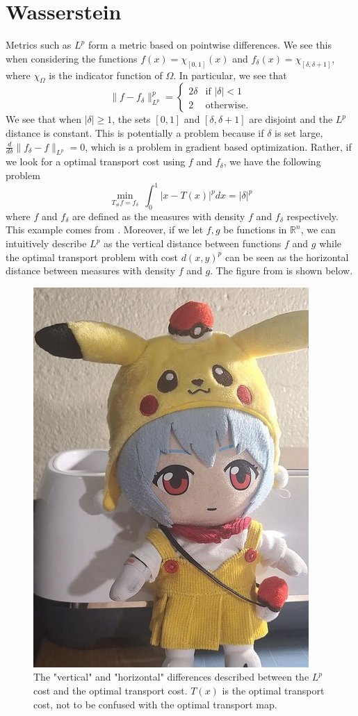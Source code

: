 \documentclass[12pt]{article}
\newcommand{\R}{\mathbb{R}}
\theoremstyle{plain}
\numberwithin{equation}{section}
\begin{document}
\section{Wasserstein}
Metrics such as $L^p$ form a metric based on pointwise differences. We see this when considering the functions $f(x)=\chi_{[0,1]}(x)$ and $f_\delta(x) = \chi_{[\delta,\delta+1]}$, where $\chi_\Omega$ is the indicator function of $\Omega$.
In particular, we see that 
\[\|f-f_\delta\|_{L^p}^p = \begin{cases} 2\delta &\text{if $|\delta| < 1$} \\
2 &\text{otherwise.}\end{cases}\]
We see that when $|\delta| \ge 1$, the sets $[0,1]$ and $[\delta,\delta+1]$ are disjoint and the $L^p$ distance is constant. This is potentially a problem because if $\delta$ is set large, $\frac{d}{d\delta}\|f_\delta - f \|_{L^p} = 0$, which is a problem in gradient based optimization.\newline
Rather, if we look for a optimal transport cost using $f$ and $f_\delta$, we have the following problem 
\[\min_{T_\#f = f_\delta}\ \int_0^1|x-T(x)|^pdx = |\delta|^p\]
where $f$ and $f_\delta$ are defined as the measures with density $f$ and $f_\delta$ respectively. This example comes from \cite{thorpe}.\newline
Moreover, if we let $f,g$ be functions in $\R^n$, we can intuitively describe $L^p$ as the vertical distance between functions $f$ and $g$ while the optimal transport problem with cost $d(x,y)^p$ can be seen as the horizontal distance between measures with density $f$ and $g$. The figure from \cite{santambrogio} is shown below.
\begin{figure}[H]
  \center
  \includegraphics[scale=0.5]{banner.jpg}
  \caption{The "vertical" and "horizontal" differences described between the $L^p$ cost and the optimal transport cost. $T(x)$ is the optimal transport cost, not to be confused with the optimal transport map.}
\end{figure}
\end{document}
